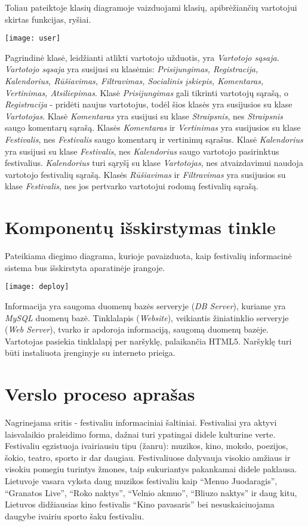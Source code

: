 ﻿\documentclass{VUMIFPSkursinis}
\begin{document}
{Toliau pateiktoje klasių diagramoje vaizduojami klasių, apibrėžiančių vartotojui skirtas funkcijas, ryšiai.
\begin{center}
    \texttt{[image: user]}
\end{center}
Pagrindinė klasė, leidžianti atlikti vartotojo užduotis, yra \textit{Vartotojo sąsaja}. \textit{Vartotojo sąsaja} yra susijusi su klasėmis: \textit{Prisijungimas, Registracija, Kalendorius, Rūšiavimas, Filtravimas, Socialinis įskiepis, Komentaras, Vertinimas, Atsiliepimas}. Klasė \textit{Prisijungimas} gali tikrinti vartotojų sąrašą, o \textit{Registracija} - pridėti naujus vartotojus, todėl šios klasės yra susijusios su klase \textit{Vartotojas}. Klasė \textit{Komentaras} yra susijusi su klase \textit{Straipsnis}, nes \textit{Straipsnis} saugo komentarų sąrašą. Klasės \textit{Komentaras} ir \textit{Vertinimas} yra susijusios su klase \textit{Festivalis}, nes \textit{Festivalis} saugo komentarų ir vertinimų sąrašus. Klasė \textit{Kalendorius} yra susijusi su klase \textit{Festivalis}, nes \textit{Kalendorius} saugo vartotojo pasirinktus festivalius. \textit{Kalendorius} turi sąryšį su klase \textit{Vartotojas}, nes atvaizdavimui naudoja vartotojo festivalių sąrašą. Klasės \textit{Rūšiavimas} ir \textit{Filtravimas} yra susijusios su klase \textit{Festivalis}, nes jos pertvarko vartotojui rodomą festivalių sąrašą.

\section{Komponentų išskirstymas tinkle}
Pateikiama diegimo diagrama, kurioje pavaizduota, kaip festivalių informacinė sistema bus išskirstyta aparatinėje įrangoje. 
\begin{center}
    \texttt{[image: deploy]}
\end{center}
Informacija yra saugoma duomenų bazės serveryje (\textit{DB Server}), kuriame yra \textit{MySQL} duomenų bazė. Tinklalapis (\textit{Website}), veikiantis žiniatinklio serveryje (\textit{Web Server}), tvarko ir apdoroja informaciją, saugomą duomenų bazėje. Vartotojas pasiekia tinklalapį per naršyklę, palaikančia HTML5. Naršyklę turi būti instaliuota įrenginyje su interneto prieiga.


\section{Verslo proceso aprašas}

Nagrinejama sritis - festivaliu informaciniai šaltiniai. 
Festivaliai yra aktyvi laisvalaikio praleidimo forma, dažnai turi ypatingai didele kulturine verte. 
Festivaliu egzistuoja ivairiausiu tipu (žanru): muzikos, kino, mokslo, poezijos, šokio, teatro, sporto ir dar daugiau. 
Festivaliuose dalyvauja visokio amžiaus ir visokiu pomegiu turintys žmones, taip sukuriantys pakankamai didele paklausa. 
Lietuvoje vasara vyksta daug muzikos festivaliu kaip “Menuo Juodaragis”, “Granatos Live”, “Roko naktys”, “Velnio akmuo”, “Bliuzo naktys” ir daug kitu,
 Lietuvos didžiausias kino festivalis “Kino pavasaris” bei nesuskaiciuojama daugybe ivairiu sporto šaku festivaliu.

}
\end{document}
